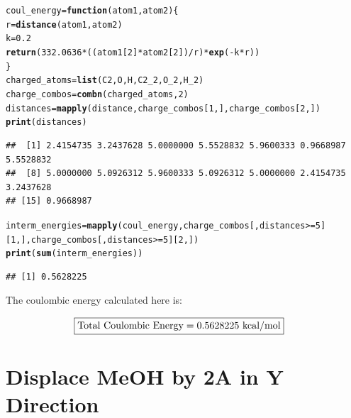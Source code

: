 \documentclass{article}\usepackage[]{graphicx}\usepackage[]{color}
\makeatletter
\newcommand{\hlnum}[1]{\textcolor[rgb]{0.686,0.059,0.569}{#1}}%
\newcommand{\hlopt}[1]{\textcolor[rgb]{0,0,0}{#1}}%
\newcommand{\hlstd}[1]{\textcolor[rgb]{0.345,0.345,0.345}{#1}}%
\newcommand{\hlkwa}[1]{\textcolor[rgb]{0.161,0.373,0.58}{\textbf{#1}}}%
\newcommand{\hlkwb}[1]{\textcolor[rgb]{0.69,0.353,0.396}{#1}}%
\newcommand{\hlkwc}[1]{\textcolor[rgb]{0.333,0.667,0.333}{#1}}%
\newcommand{\hlkwd}[1]{\textcolor[rgb]{0.737,0.353,0.396}{\textbf{#1}}}%
\newenvironment{kframe}{%
 \def\at@end@of@kframe{}%
 \ifinner\ifhmode%
  \def\at@end@of@kframe{\end{minipage}}%
  \begin{minipage}{\columnwidth}%
 \fi\fi%
 \def\FrameCommand##1{\hskip\@totalleftmargin \hskip-\fboxsep
 \colorbox{shadecolor}{##1}\hskip-\fboxsep
     \hskip-\linewidth \hskip-\@totalleftmargin \hskip\columnwidth}%
 \MakeFramed {\advance\hsize-\width
   \@totalleftmargin\z@ \linewidth\hsize
   \@setminipage}}%
 {\par\unskip\endMakeFramed%
 \at@end@of@kframe}
\newenvironment{knitrout}{}{} %
\makeatother
\begin{document}
\begin{knitrout}
\color{fgcolor}\begin{kframe}
\begin{alltt}
  \hlstd{coul_energy}\hlkwb{=}\hlkwa{function}\hlstd{(}\hlkwc{atom1}\hlstd{,}\hlkwc{atom2}\hlstd{)\{}
    \hlstd{r}\hlkwb{=}\hlkwd{distance}\hlstd{(atom1,atom2)}
    \hlstd{k}\hlkwb{=}\hlnum{0.2}
    \hlkwd{return}\hlstd{(}\hlnum{332.0636}\hlopt{*}\hlstd{((atom1[}\hlnum{2}\hlstd{]}\hlopt{*}\hlstd{atom2[}\hlnum{2}\hlstd{])}\hlopt{/}\hlstd{r)}\hlopt{*}\hlkwd{exp}\hlstd{(}\hlopt{-}\hlstd{k}\hlopt{*}\hlstd{r))}
  \hlstd{\}}
  \hlstd{charged_atoms} \hlkwb{=} \hlkwd{list}\hlstd{(C2,O,H,C2_2,O_2,H_2)}
  \hlstd{charge_combos} \hlkwb{=} \hlkwd{combn}\hlstd{(charged_atoms,}\hlnum{2}\hlstd{)}
  \hlstd{distances}\hlkwb{=}\hlkwd{mapply}\hlstd{(distance,charge_combos[}\hlnum{1}\hlstd{,],charge_combos[}\hlnum{2}\hlstd{,])}
  \hlkwd{print}\hlstd{(distances)}
\end{alltt}
\begin{verbatim}
##  [1] 2.4154735 3.2437628 5.0000000 5.5528832 5.9600333 0.9668987 5.5528832
##  [8] 5.0000000 5.0926312 5.9600333 5.0926312 5.0000000 2.4154735 3.2437628
## [15] 0.9668987
\end{verbatim}
\begin{alltt}
  \hlstd{interm_energies} \hlkwb{=} \hlkwd{mapply}\hlstd{(coul_energy,charge_combos[,distances}\hlopt{>=}\hlnum{5}\hlstd{][}\hlnum{1}\hlstd{,],charge_combos[,distances}\hlopt{>=}\hlnum{5}\hlstd{][}\hlnum{2}\hlstd{,])}
  \hlkwd{print}\hlstd{(}\hlkwd{sum}\hlstd{(interm_energies))}
\end{alltt}
\begin{verbatim}
## [1] 0.5628225
\end{verbatim}
\end{kframe}
\end{knitrout}

The coulombic energy calculated here is:

\begin{align*}
  \Aboxed{\text{Total Coulombic Energy}=0.5628225\ \text{kcal/mol}}
\end{align*}

\section{Displace MeOH by 2A in Y Direction}
\end{document}
